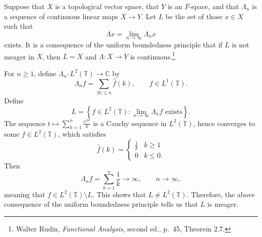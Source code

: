 \documentclass{article}
\theoremstyle{definition}
\begin{document}
Suppose that $X$ is a topological vector space, that $Y$ is an $F$-space, and that $\Lambda_n$ is a sequence of continuous linear maps
$X \to Y$. Let $L$ be the set of those $x \in X$ such that
\[
\Lambda x = \lim_{n \to \infty} \Lambda_n x
\]
exists. It is a consequence of the uniform boundedness principle that if $L$ is not meager in $X$, then $L=X$ and $\Lambda:X \to Y$ is continuous.\footnote{Walter Rudin,
{\em Functional Analysis}, second ed., p.~45, Theorem 2.7.}

For $n \geq 1$, define $\Lambda_n:L^2(\mathbb{T}) \to \mathbb{C}$ by
\[
\Lambda_n f = \sum_{|k| \leq n} \hat{f}(k),
\qquad f \in L^1(\mathbb{T}).
\]
Define
\[
L=\left\{ f \in L^2(\mathbb{T}): \textrm{$\lim_{n \to \infty} \Lambda_n f$ exists}\right\}.
\]
The sequence $t \mapsto \sum_{k=1}^n \frac{e^{ikt}}{k}$ is a Cauchy sequence in $L^2(\mathbb{T})$, 
hence converges to some $f \in L^2(\mathbb{T})$, which satisfies
\[
\hat{f}(k) =\begin{cases}
 \frac{1}{k} & k \geq 1\\
 0&k \leq 0.
 \end{cases}
\]
Then
\[
\Lambda_n f = \sum_{k=1}^n \frac{1}{k} \to \infty, \qquad n \to \infty,
\]
meaning that $f \in L^2(\mathbb{T}) \setminus L$. This shows that
$L \neq L^2(\mathbb{T})$. Therefore,  the above consequence of the uniform boundedness principle
tells us that
$L$ is meager. 
\end{document}
